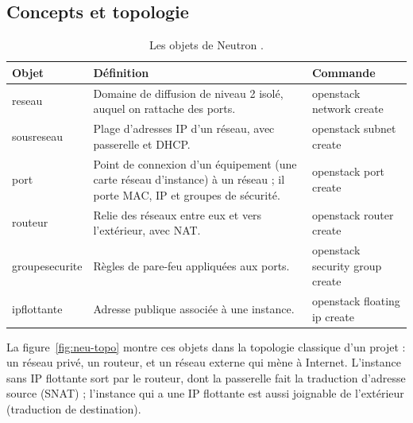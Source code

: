 \subsection{Concepts et topologie}\label{sec:neu-concepts}

\begin{table}[!ht]
\centering
\renewcommand{\arraystretch}{1.3}
\begin{tabular}{@{}>{\raggedright\arraybackslash}p{3.4cm}>{\raggedright\arraybackslash}p{8.4cm}>{\raggedright\arraybackslash\ttfamily}p{3.7cm}@{}}
\toprule
\textbf{Objet} & \textbf{Définition} & \textrm{\textbf{Commande}} \\
\midrule
\Gls{reseau} & Domaine de diffusion de niveau 2 isolé, auquel on rattache des ports. & openstack network create \\
\Gls{sousreseau} & Plage d'adresses IP d'un réseau, avec passerelle et DHCP. & openstack subnet create \\
\Gls{port} & Point de connexion d'un équipement (une carte réseau d'instance) à un réseau ; il porte MAC, IP et groupes de sécurité. & openstack port create \\
\Gls{routeur} & Relie des réseaux entre eux et vers l'extérieur, avec NAT. & openstack router create \\
\Gls{groupesecurite} & Règles de pare-feu appliquées aux ports. & openstack security group create \\
\Gls{ipflottante} & Adresse publique associée à une instance. & openstack floating ip create \\
\bottomrule
\end{tabular}
\caption{Les objets de Neutron \parencite{neutron-intro}.}
\label{tab:neu-objets}
\end{table}

La figure~\ref{fig:neu-topo} montre ces objets dans la topologie classique d'un projet : un réseau privé, un routeur, et un
réseau externe qui mène à Internet. L'instance sans IP flottante sort par le routeur, dont la passerelle fait la traduction
d'adresse source (SNAT) ; l'instance qui a une IP flottante est aussi joignable de l'extérieur (traduction de destination).

